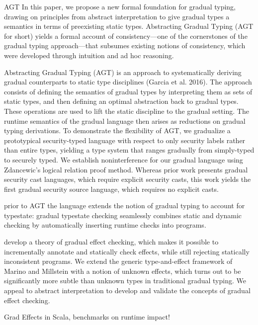 \label{grad-guarantee}

\cite{garcia2016abstracting}
AGT
In this paper, we propose a new formal foundation for gradual
typing, drawing on principles from abstract interpretation to
give gradual types a semantics in terms of preexisting static types.
Abstracting Gradual Typing (AGT for short) yields a formal account
of consistency—one of the cornerstones of the gradual typing
approach—that subsumes existing notions of consistency, which
were developed through intuition and ad hoc reasoning.

\cite{garcia2015deriving}
Abstracting Gradual Typing (AGT) is an approach to systematically
deriving gradual counterparts to static type disciplines (Garcia
et al. 2016). The approach consists of defining the semantics of
gradual types by interpreting them as sets of static types, and then
defining an optimal abstraction back to gradual types. These operations
are used to lift the static discipline to the gradual setting. The
runtime semantics of the gradual language then arises as reductions
on gradual typing derivations.
To demonstrate the flexibility of AGT, we gradualize
a prototypical security-typed language
with respect to only security labels rather than entire types, yielding
a type system that ranges gradually from simply-typed to securely typed.
We establish noninterference for our gradual language using Zdancewic’s logical relation proof method.
Whereas prior work presents gradual security cast languages,
which require explicit security casts, this work yields the first gradual
security source language, which requires no explicit casts.

prior to AGT
\cite{wolff2011gradual}
the language extends the notion of gradual typing to account for typestate: gradual typestate
checking seamlessly combines static and dynamic checking by automatically
inserting runtime checks into programs.

\cite{banados2014theory}
 develop a theory of gradual effect checking, which
 makes it possible to incrementally annotate and statically check
 effects, while still rejecting statically inconsistent programs. We
 extend the generic type-and-effect framework of Marino and Millstein
 with a notion of unknown effects, which turns out to be significantly
 more subtle than unknown types in traditional gradual
 typing. We appeal to abstract interpretation to develop and validate
 the concepts of gradual effect checking.

\cite{toro2015customizable}
Grad Effects in Scala, benchmarks on runtime impact!


